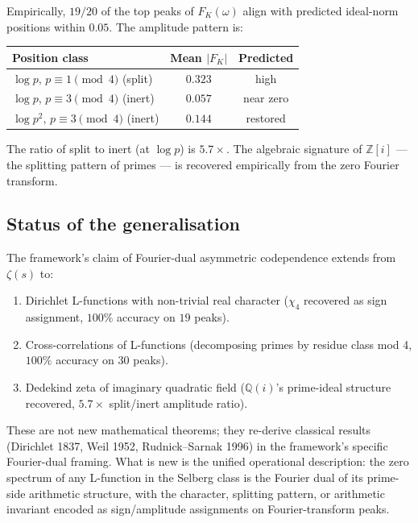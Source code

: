 \documentclass[11pt,a4paper]{article}
\theoremstyle{plain}
\theoremstyle{definition}
\theoremstyle{remark}
\begin{document}
Empirically, $19/20$ of the top peaks of $F_K(\omega)$ align with
predicted ideal-norm positions within $0.05$. The amplitude pattern
is:

\begin{center}
\begin{tabular}{lcc}
\toprule
Position class & Mean $|F_K|$ & Predicted \\
\midrule
$\log p$, $p \equiv 1 \pmod{4}$ (split) & $0.323$ & high \\
$\log p$, $p \equiv 3 \pmod{4}$ (inert) & $0.057$ & near zero \\
$\log p^2$, $p \equiv 3 \pmod{4}$ (inert) & $0.144$ & restored \\
\bottomrule
\end{tabular}
\end{center}

The ratio of split to inert (at $\log p$) is $5.7\times$. The algebraic
signature of $\mathbb{Z}[i]$ --- the splitting pattern of primes ---
is recovered empirically from the zero Fourier transform.

\subsection{Status of the generalisation}
\label{sec:lfunctions-status}

The framework's claim of Fourier-dual asymmetric codependence extends
from $\zeta(s)$ to:
\begin{enumerate}
\item Dirichlet L-functions with non-trivial real character ($\chi_4$
recovered as sign assignment, $100\%$ accuracy on $19$ peaks).
\item Cross-correlations of L-functions (decomposing primes by residue
class mod 4, $100\%$ accuracy on $30$ peaks).
\item Dedekind zeta of imaginary quadratic field ($\mathbb{Q}(i)$'s
prime-ideal structure recovered, $5.7\times$ split/inert amplitude ratio).
\end{enumerate}

These are not new mathematical theorems; they re-derive classical results
(Dirichlet 1837, Weil 1952, Rudnick--Sarnak 1996) in the framework's
specific Fourier-dual framing. What is new is the unified operational
description: the zero spectrum of any L-function in the Selberg class
is the Fourier dual of its prime-side arithmetic structure, with the
character, splitting pattern, or arithmetic invariant encoded as
sign/amplitude assignments on Fourier-transform peaks.
\end{document}
